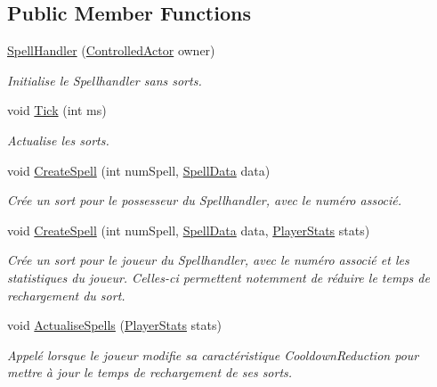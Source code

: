 \subsection*{Public Member Functions}
\begin{DoxyCompactItemize}
\item 
\hyperlink{class_tentacle_slicers_1_1spells_1_1_spell_handler_a7a51dff0edbbc1c0c6ac99af89c4b757}{Spell\+Handler} (\hyperlink{class_tentacle_slicers_1_1actors_1_1_controlled_actor}{Controlled\+Actor} owner)
\begin{DoxyCompactList}\small\item\em Initialise le Spellhandler sans sorts. \end{DoxyCompactList}\item 
void \hyperlink{class_tentacle_slicers_1_1spells_1_1_spell_handler_a47c8173e5ce918165b4b4b85ca20d44f}{Tick} (int ms)
\begin{DoxyCompactList}\small\item\em Actualise les sorts. \end{DoxyCompactList}\item 
void \hyperlink{class_tentacle_slicers_1_1spells_1_1_spell_handler_a21bcc65c646df5c305e7c92ab31341b6}{Create\+Spell} (int num\+Spell, \hyperlink{class_tentacle_slicers_1_1spells_1_1_spell_data}{Spell\+Data} data)
\begin{DoxyCompactList}\small\item\em Crée un sort pour le possesseur du Spellhandler, avec le numéro associé. \end{DoxyCompactList}\item 
void \hyperlink{class_tentacle_slicers_1_1spells_1_1_spell_handler_ae639fa595626e043cb07d0e0ab909a6d}{Create\+Spell} (int num\+Spell, \hyperlink{class_tentacle_slicers_1_1spells_1_1_spell_data}{Spell\+Data} data, \hyperlink{class_tentacle_slicers_1_1actors_1_1_player_stats}{Player\+Stats} stats)
\begin{DoxyCompactList}\small\item\em Crée un sort pour le joueur du Spellhandler, avec le numéro associé et les statistiques du joueur. Celles-\/ci permettent notemment de réduire le temps de rechargement du sort. \end{DoxyCompactList}\item 
void \hyperlink{class_tentacle_slicers_1_1spells_1_1_spell_handler_a6ac92e59c19c60376e248d277b2fa193}{Actualise\+Spells} (\hyperlink{class_tentacle_slicers_1_1actors_1_1_player_stats}{Player\+Stats} stats)
\begin{DoxyCompactList}\small\item\em Appelé lorsque le joueur modifie sa caractéristique Cooldown\+Reduction pour mettre à jour le temps de rechargement de ses sorts. \end{DoxyCompactList}\item 

\end{DoxyCompactItemize}
